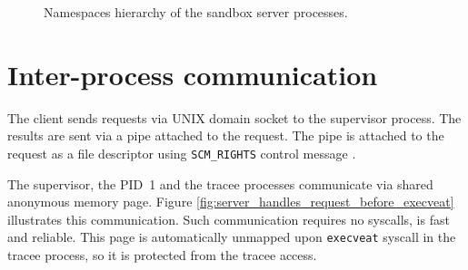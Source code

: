 \documentclass[en]{pracamgr}
\begin{document}
\begin{figure}[h]
\caption{Namespaces hierarchy of the sandbox server processes.}
\label{fig:server_namespaces}
\end{figure}

\section{Inter-process communication}

The client sends requests via UNIX domain socket to the supervisor process. The results are sent via a pipe attached to the request. The pipe is attached to the request as a file descriptor using \texttt{SCM\_RIGHTS} control message \cite{man_unix}.

The supervisor, the PID~1 and the tracee processes communicate via shared anonymous memory page. Figure \ref{fig:server_handles_request_before_execveat} illustrates this communication. Such communication requires no syscalls, is fast and reliable. This page is automatically unmapped upon \texttt{execveat} syscall \cite{man_execveat} in the tracee process, so it is protected from the tracee access.
\end{document}
